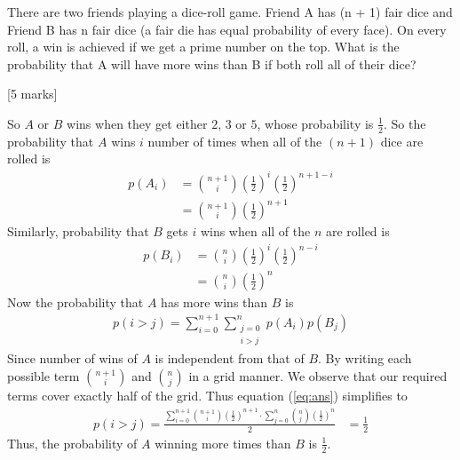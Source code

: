 \begin{que}
	There are two friends playing a dice-roll game. Friend A has (n + 1) fair dice and Friend B has n
	fair dice (a fair die has equal probability of every face). On every roll, a win is achieved if we get a
	prime number on the top. What is the probability that A will have more wins than B if both roll
	all of their dice?

	\hspace*{\fill} [5 marks]
\end{que}
\begin{tcolorbox}
	\begin{sol}
		So $A$ or $B$ wins when they get either $2$, $3$ or $5$, whose probability is $\frac{1}{2}$. So the probability that $A$ wins $i$ number of times when all of the $(n+1)$ dice are rolled is
		\begin{align}
			p(A_i) & = \binom{n+1}{i} \left(\frac{1}{2}\right)^{i} \left(\frac{1}{2}\right)^{n+1-i} \\
			       & = \binom{n+1}{i} \left(\frac{1}{2}\right)^{n+1}
		\end{align}
		Similarly, probability that $B$ gets $i$ wins when all of the $n$ are rolled is
		\begin{align}
			p(B_i) & = \binom{n}{i} \left(\frac{1}{2}\right)^{i} \left(\frac{1}{2}\right)^{n-i} \\
			       & = \binom{n}{i} \left(\frac{1}{2}\right)^{n}
		\end{align}
		Now the probability that $A$ has more wins than $B$ is
		\begin{align}
			p(i>j) = \sum_{i=0}^{n+1}\sum_{\substack{j=0 \\ i>j}}^{n} p(A_i)p(B_j)
			\label{eq:ans}
		\end{align}
		Since number of wins of $A$ is independent from that of $B$.
		By writing each possible term $\binom{n+1}{i}$ and $\binom{n}{j}$ in a grid manner. We observe that our required terms cover exactly half of the grid. Thus equation (\ref{eq:ans}) simplifies to
		\begin{align}
			p(i>j) = \frac{\sum_{i=0}^{n+1}\binom{n+1}{i}\left(\frac{1}{2}\right)^{n+1}\cdot\sum_{j=0}^{n}\binom{n}{j}\left(\frac{1}{2}\right)^{n}}{2}
			 & = \frac{1}{2}
		\end{align}
		Thus, the probability of $A$ winning more times than $B$ is $\frac{1}{2}$.
	\end{sol}
\end{tcolorbox}
